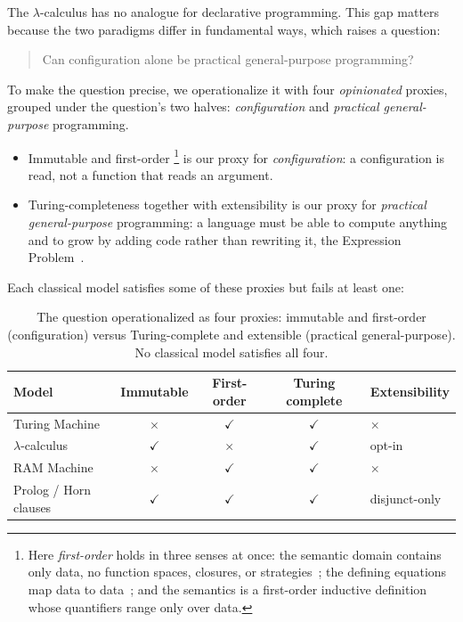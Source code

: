 The $\lambda$-calculus has no analogue for declarative
programming. This gap matters because the two paradigms differ in
fundamental ways, which raises a question:

\begin{quote}
  Can configuration alone be practical general-purpose programming?
\end{quote}

\noindent
To make the question precise, we operationalize it with four
\emph{opinionated} proxies, grouped under the question's two halves:
\emph{configuration} and \emph{practical general-purpose} programming.

\begin{itemize}
  \item Immutable and first-order%
    \footnote{
      Here \emph{first-order} holds in three senses at once:
      the semantic domain contains only data, no function spaces,
      closures, or
      strategies~\cite{vanemden1976-predicate-logic-semantics};
      the defining equations map data to
      data~\cite{reynolds1972-definitional-interpreters};
      and the semantics is a first-order inductive
      definition~\cite{aczel1977-inductive-definitions} whose
      quantifiers range only over data.
    }
    is our proxy for
    \emph{configuration}: a configuration is read, not a function that
    reads an argument.
  \item Turing-completeness together with extensibility is our proxy for
    \emph{practical general-purpose} programming: a language must be able
    to compute anything and to grow by adding code rather than rewriting
    it, the Expression
    Problem~\cite{wadler1998-expression-problem}.
\end{itemize}

\noindent
Each classical model satisfies some of these proxies but fails at least
one:

\begin{table}[h]
  \centering
  \small
  \begin{tabular}{lcccl}
    \textbf{Model} & \textbf{Immutable} & \textbf{First-order} & \textbf{Turing complete} & \textbf{Extensibility} \\
    \hline
    Turing Machine        & $\times$     & $\checkmark$ & $\checkmark$ & $\times$ \\
    $\lambda$-calculus    & $\checkmark$ & $\times$     & $\checkmark$ & opt-in \\
    RAM Machine           & $\times$     & $\checkmark$ & $\checkmark$ & $\times$ \\
    Prolog / Horn clauses & $\checkmark$ & $\checkmark$ & $\checkmark$ & disjunct-only \\
  \end{tabular}
  \caption{The question operationalized as four proxies: immutable and
    first-order (configuration) versus Turing-complete and extensible
  (practical general-purpose). No classical model satisfies all four.}
  \label{tab:computational-models}
\end{table}

